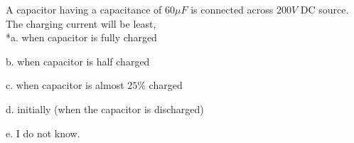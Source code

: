 
A capacitor having a capacitance of \( 60 \mu F \) is connected across \( 200 V \) DC source. The charging current will be least,\\

*a. when capacitor is fully charged

b. when capacitor is half charged

c. when capacitor is almost \( 25\% \) charged

d. initially (when the capacitor is discharged)

e. I do not know.\\
